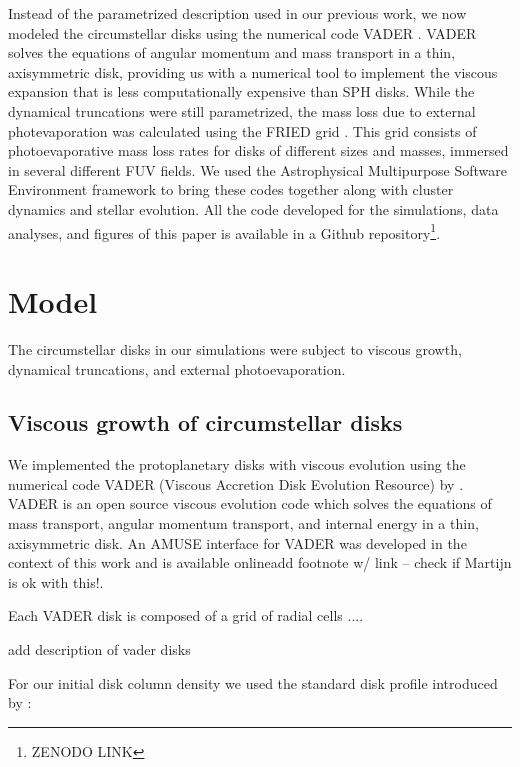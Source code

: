 \documentclass[fleqn,usenatbib]{mnras}
\newcommand\note[1]{{\colorbox{yellow!60}{\color{magenta}#1}}}
\begin{document}
Instead of the parametrized description used in our previous work, we now modeled the circumstellar disks using the numerical code VADER \citep{krumholz2015}. VADER solves the equations of angular momentum and mass transport in a thin, axisymmetric disk, providing us with a numerical tool to implement the viscous expansion that is less computationally expensive than SPH disks. While the dynamical truncations were still parametrized, the mass loss due to external photevaporation was calculated using the FRIED grid \citep{haworth2018}. This grid consists of photoevaporative mass loss rates for disks of different sizes and masses, immersed in several different FUV fields. We used the Astrophysical Multipurpose Software Environment \citep[AMUSE\footnote{\url{http://amusecode.org}},][]{portegieszwart2013,pelupessy2013} framework to bring these codes together along with cluster dynamics and stellar evolution. All the code developed for the simulations, data analyses, and figures of this paper is available in a Github repository\footnote{ZENODO LINK}.


\section{Model}
\label{sec:model}

The circumstellar disks in our simulations were subject to viscous growth, dynamical truncations, and external photoevaporation. 

\subsection{Viscous growth of circumstellar disks}\label{viscous}
We implemented the protoplanetary disks with viscous evolution using the numerical code VADER (Viscous Accretion Disk Evolution Resource) by \citet{krumholz2015}. VADER is an open source viscous evolution code which solves the equations of mass transport, angular momentum transport, and internal energy in a thin, axisymmetric disk. An AMUSE interface for VADER was developed in the context of this work and is available online\note{add footnote w/ link -- check if Martijn is ok with this!}.  

Each VADER disk is composed of a grid of radial cells .... 

\note{add description of vader disks}

For our initial disk column density we used the standard disk profile introduced by \citet{lynden-bell1974}:
\end{document}
